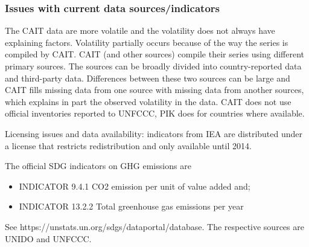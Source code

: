 \documentclass[
  letterpaper,
  DIV=11,
  numbers=noendperiod]{scrartcl}
\providecommand{\tightlist}{%
  \setlength{\itemsep}{0pt}\setlength{\parskip}{0pt}}\usepackage{longtable,booktabs,array}
\begin{document}
\hypertarget{issues-with-current-data-sourcesindicators}{%
\subsubsection{Issues with current data
sources/indicators}\label{issues-with-current-data-sourcesindicators}}

The CAIT data are more volatile and the volatility does not always have
explaining factors. Volatility partially occurs because of the way the
series is compiled by CAIT. CAIT (and other sources) compile their
series using different primary sources. The sources can be broadly
divided into country-reported data and third-party data. Differences
between these two sources can be large and CAIT fills missing data from
one source with missing data from another sources, which explains in
part the observed volatility in the data. CAIT does not use official
inventories reported to UNFCCC, PIK does for countries where available.

Licensing issues and data availability: indicators from IEA are
distributed under a license that restricts redistribution and only
available until 2014.

The official SDG indicators on GHG emissions are

\begin{itemize}
\tightlist
\item
  INDICATOR 9.4.1 CO2 emission per unit of value added and;
\item
  INDICATOR 13.2.2 Total greenhouse gas emissions per year
\end{itemize}

See https://unstats.un.org/sdgs/dataportal/database. The respective
sources are UNIDO and UNFCCC.
\end{document}
